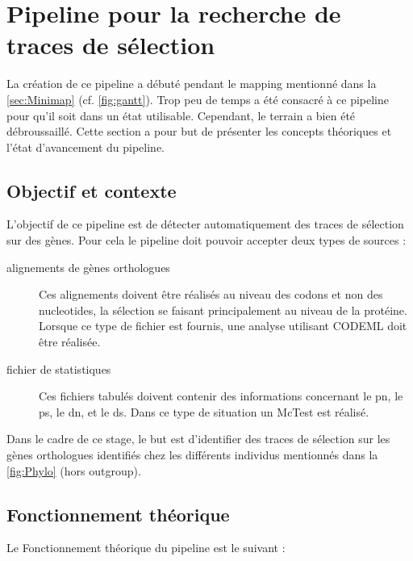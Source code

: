 \documentclass[../main]{subfiles} %
\begin{document}
\addto\extrasfrench{\protected\edef:{\unexpanded\expandafter{:}}}

\section{Pipeline pour la recherche de traces de sélection}
\label{sec:PipelineTrace}
La création de ce pipeline a débuté pendant le \gls{mapping} mentionné dans la \cref{sec:Minimap} (cf. \cref{fig:gantt}). Trop peu de temps a été consacré à ce pipeline pour qu'il soit dans un état utilisable. Cependant, le terrain a bien été débroussaillé. Cette section a pour but de présenter les concepts théoriques et l'état d'avancement du pipeline.

\subsection{Objectif et contexte}
L'objectif de ce pipeline est de détecter automatiquement des traces de sélection sur des gènes. Pour cela le pipeline doit pouvoir accepter deux types de sources :

\begin{description}
    \item[alignements de gènes \glspl{orthologue}] Ces alignements doivent être réalisés au niveau des \glspl{codon} et non des \glspl{nucleotide}, la sélection se faisant principalement au niveau de la protéine. Lorsque ce type de fichier est fournis, une analyse utilisant \gls{CODEML} doit être réalisée.
    
    \item[fichier de statistiques] Ces fichiers tabulés doivent contenir des informations concernant le \acrshort{pn}, le \acrshort{ps}, le \acrshort{dn}, et le \acrshort{ds}. Dans ce type de situation un \gls{McTest} est réalisé.
\end{description}

Dans le cadre de ce stage, le but est d'identifier des traces de sélection sur les gènes \glspl{orthologue} identifiés chez les différents individus mentionnés dans la \cref{fig:Phylo} (hors \gls{outgroup}).

\subsection{Fonctionnement théorique}
\label{sec:PipelineFoncionnement}
Le Fonctionnement théorique du pipeline est le suivant :
\end{document}
